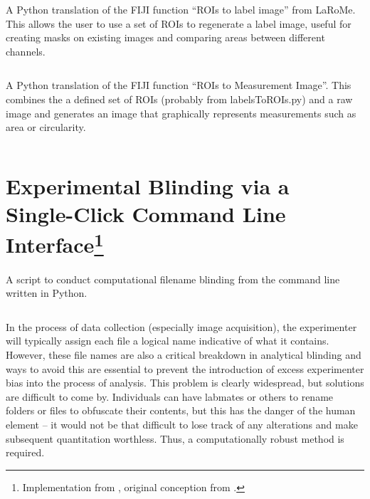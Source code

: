 \begin{code}
\caption{A Python translation of the FIJI function ``ROIs to label image'' from LaRoMe. This allows the user to use a set of ROIs to regenerate a label image, useful for creating masks on existing images and comparing areas between different channels.}
\label{r2l}

\inputminted[breaklines,frame=single,fontsize=\small]{python}{source/ROIsTolabels.py}

\end{code}



\begin{code}
\caption{A Python translation of the FIJI function ``ROIs to Measurement Image''. This combines the a defined set of ROIs (probably from labelsToROIs.py) and a raw image and generates an image that graphically represents measurements such as area or circularity.}
\label{r2m}

\inputminted[breaklines,frame=single,fontsize=\small]{python}{source/ROIsToMap.py}

\end{code}



\section[Experimental Blinding via a Single-Click Command Line Interface]{Experimental Blinding via a Single-Click Command Line Interface\footnote{Implementation from \citet{Brewer2022}, original conception from \citet{Salter2016}.}}\label{blinders}

\begin{code}
\caption{A script to conduct computational filename blinding from the command line written in Python.}
\label{blinder}

\inputminted[breaklines,frame=single,fontsize=\small]{python}{source/renamer.py}

\end{code}

In the process of data collection (especially image acquisition), the experimenter will typically assign each file a logical name indicative of what it contains. However, these file names are also a critical breakdown in analytical blinding and ways to avoid this are essential to prevent the introduction of excess experimenter bias into the process of analysis. This problem is clearly widespread, but solutions are difficult to come by. Individuals can have labmates or others to rename folders or files to obfuscate their contents, but this has the danger of the human element -- it would not be that difficult to lose track of any alterations and make subsequent quantitation worthless. Thus, a computationally robust method is required. 

